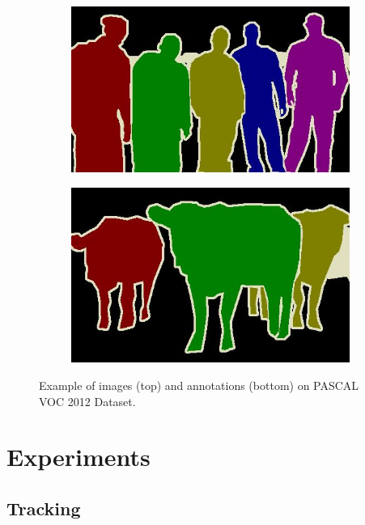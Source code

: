 \begin{figure}[h]
\begin{subfigure}{.25\textwidth}
\end{subfigure}%
\begin{subfigure}{.25\textwidth}
  \includegraphics[width=1.\linewidth,height=0.618\linewidth]{figures/pascal_dataset/annotation-3.jpg}
\end{subfigure}%
\begin{subfigure}{.25\textwidth}
  \includegraphics[width=1.\linewidth,height=0.618\linewidth]{figures/pascal_dataset/annotation-4.jpg}
\end{subfigure}
\caption{Example of images (top) and annotations (bottom) on PASCAL VOC 2012 Dataset.}
\label{fig:pascal}
\end{figure}



\section{Experiments}

\subsection{Tracking}

